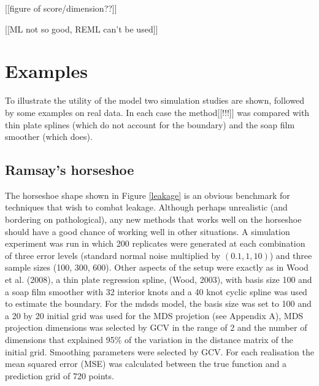 \documentclass[useAMS,referee, usegraphicx]{biom}
\begin{document}
[[figure of score/dimension??]]

[[ML not so good, REML can't be used]]

\section{Examples}
\label{examples}

To illustrate the utility of the model two simulation studies are shown, followed by some examples on real data. In each case the method[[!!!]] was compared with thin plate splines (which do not account for the boundary) and the soap film smoother (which does).

\subsection{Ramsay's horseshoe}

The horseshoe shape shown in Figure \ref{leakage} is an obvious benchmark for techniques that wish to combat leakage. Although perhaps unrealistic (and bordering on pathological), any new methods that works well on the horseshoe should have a good chance of working well in other situations. A simulation experiment was run in which 200 replicates were generated at each combination of three error levels (standard normal noise multiplied by $(0.1,1,10)$) and three sample sizes (100, 300, 600). Other aspects of the setup were exactly as in Wood et al. (2008), a thin plate regression spline, (Wood, 2003), with basis size 100 and a soap film smoother with 32 interior knots  and a 40 knot cyclic  spline was used to estimate the boundary. For the mdsds model, the basis size was set to 100 and a 20 by 20 initial grid was used for the MDS projetion (see Appendix A), MDS projection dimensions was selected by GCV in the range of 2 and the number of dimensions that explained 95\% of the variation in the distance matrix of the initial grid. Smoothing parameters were selected by GCV. For each realisation the mean squared error (MSE) was calculated between the true function and a prediction grid of 720 points.
\end{document}
